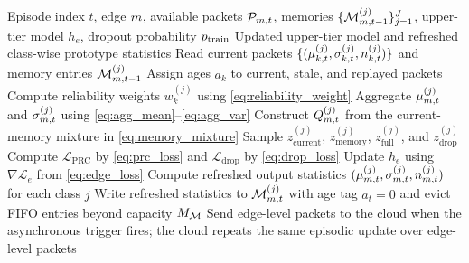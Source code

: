\begin{algorithm}[t]
\caption{E-HSFP Episodic Edge/Cloud Update}
\label{alg:ehsfp}
\begin{algorithmic}[1]
\Require Episode index $t$, edge $m$, available packets $\mathcal{P}_{m,t}$, memories $\{\mathcal{M}_{m,t-1}^{(j)}\}_{j=1}^{J}$, upper-tier model $h_e$, dropout probability $p_{\mathrm{train}}$
\Ensure Updated upper-tier model and refreshed class-wise prototype statistics
    \State Read current packets $\{(\mu_{k,t}^{(j)},\sigma_{k,t}^{(j)},n_{k,t}^{(j)})\}$ and memory entries $\mathcal{M}_{m,t-1}^{(j)}$
    \State Assign ages $a_k$ to current, stale, and replayed packets
    \State Compute reliability weights $w_k^{(j)}$ using \eqref{eq:reliability_weight}
    \State Aggregate $\mu_{m,t}^{(j)}$ and $\sigma_{m,t}^{(j)}$ using \eqref{eq:agg_mean}--\eqref{eq:agg_var}
    \State Construct $Q_{m,t}^{(j)}$ from the current-memory mixture in \eqref{eq:memory_mixture}
    \State Sample $z_{\mathrm{current}}^{(j)}$, $z_{\mathrm{memory}}^{(j)}$, $z_{\mathrm{full}}^{(j)}$, and $z_{\mathrm{drop}}^{(j)}$
\EndFor
\State Compute $\mathcal{L}_{\mathrm{PRC}}$ by \eqref{eq:prc_loss} and $\mathcal{L}_{\mathrm{drop}}$ by \eqref{eq:drop_loss}
\State Update $h_e$ using $\nabla\mathcal{L}_e$ from \eqref{eq:edge_loss}
\State Compute refreshed output statistics $(\mu_{m,t}^{(j)},\sigma_{m,t}^{(j)},n_{m,t}^{(j)})$ for each class $j$
\State Write refreshed statistics to $\mathcal{M}_{m,t}^{(j)}$ with age tag $a_t=0$ and evict FIFO entries beyond capacity $M_{\mathcal{M}}$
\State Send edge-level packets to the cloud when the asynchronous trigger fires; the cloud repeats the same episodic update over edge-level packets
\end{algorithmic}
\end{algorithm}
